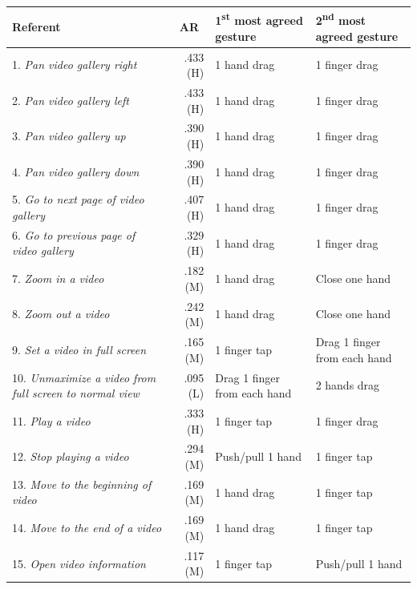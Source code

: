 \begin{table}[ht]
	\renewcommand{\arraystretch}{1.1}
	\captionsetup{justification=centering}
	\footnotesize
	\begin{tabular}{p{3.35cm}rp{2.875cm}p{2.975cm}}
		\toprule
		\textbf{Referent} & \multicolumn{1}{c}{\textbf{AR}} & \textbf{1\textsuperscript{st} most agreed gesture} & \textbf{2\textsuperscript{nd} most agreed gesture} \\
		\midrule
		1. \textit{Pan video gallery right} & \cellcolor{highlightcolor} .433 (H) & 1 hand drag & 1 finger drag\\
        2. \textit{Pan video gallery left} & \cellcolor{highlightcolor} .433 (H) & 1 hand drag & 1 finger drag\\
        3. \textit{Pan video gallery up} & \cellcolor{highlightcolor} .390 (H) & 1 hand drag & 1 finger drag\\
        4. \textit{Pan video gallery down} & \cellcolor{highlightcolor} .390 (H) & 1 hand drag & 1 finger drag\\
        5. \textit{Go to next page of video gallery} & \cellcolor{highlightcolor} .407 (H) & 1 hand drag & 1 finger drag\\
        6. \textit{Go to previous page of video gallery} & \cellcolor{highlightcolor} .329 (H) & 1 hand drag & 1 finger drag\\
        7. \textit{Zoom in a video} & .182 (M) & 1 hand drag & Close one hand\\
        8. \textit{Zoom out a video} & \cellcolor{highlightcolor} .242 (M) & 1 hand drag & Close one hand\\
        9. \textit{Set a video in full screen} & .165 (M) & 1 finger tap & Drag 1 finger from each hand\\
        10. \textit{Unmaximize a video from full screen to normal view} & .095 (L) & Drag 1 finger from each hand & 2 hands drag\\
        11. \textit{Play a video} & \cellcolor{highlightcolor} .333 (H) & 1 finger tap & 1 finger drag\\
        12. \textit{Stop playing a video} & \cellcolor{highlightcolor} .294 (M) & Push/pull 1 hand & 1 finger tap\\
        13. \textit{Move to the beginning of video} & .169 (M) & 1 hand drag & 1 finger tap\\
        14. \textit{Move to the end of a video} & .169 (M) & 1 hand drag & 1 finger tap\\
        15. \textit{Open video information} & .117 (M) & 1 finger tap & Push/pull 1 hand\\

\end{tabular}
\end{table}

